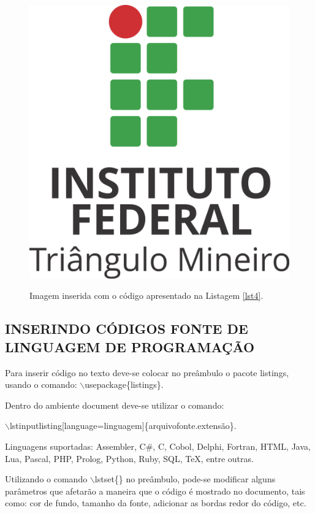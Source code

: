 \begin{figure}[h]
	\centering
	\includegraphics[scale=0.4]{imagens/iftm.png}\\
	\caption{Imagem inserida com o código apresentado na Listagem \ref{lst4}.}
	\label{if}
\end{figure}

\subsection{INSERINDO CÓDIGOS FONTE DE LINGUAGEM DE PROGRAMAÇÃO}
Para inserir código no texto deve-se colocar no preâmbulo o pacote listings, usando o comando: $\backslash$usepackage\{listings\}.

Dentro do ambiente document deve-se utilizar o comando:

$\backslash$lstinputlisting[language=linguagem]\{arquivofonte.extensão\}.

Linguagens suportadas: Assembler, C\#, C, Cobol, Delphi, Fortran, HTML, Java, Lua, Pascal, PHP, Prolog, Python, Ruby, SQL, TeX, entre outras.

Utilizando o comando $\backslash$lstset\{\} no preâmbulo, pode-se modificar alguns parâmetros que afetarão a maneira que o código é mostrado no documento, tais como: cor de fundo, tamanho da fonte, adicionar as bordas redor do código, etc.

